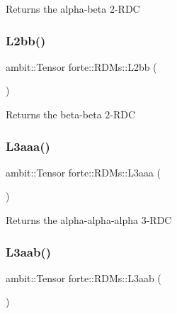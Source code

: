 \begin{DoxyReturn}{Returns}
the alpha-\/beta 2-\/\+R\+DC 
\end{DoxyReturn}
\mbox{\label{classforte_1_1_r_d_ms_ab17613d72744866495c70c87df7fc8fd}} 
\subsubsection{\texorpdfstring{L2bb()}{L2bb()}}
{\footnotesize\ttfamily ambit\+::\+Tensor forte\+::\+R\+D\+Ms\+::\+L2bb (\begin{DoxyParamCaption}{ }\end{DoxyParamCaption})}

\begin{DoxyReturn}{Returns}
the beta-\/beta 2-\/\+R\+DC 
\end{DoxyReturn}
\mbox{\label{classforte_1_1_r_d_ms_acdea5a25d0dfd063e38694b80688e8c4}} 
\subsubsection{\texorpdfstring{L3aaa()}{L3aaa()}}
{\footnotesize\ttfamily ambit\+::\+Tensor forte\+::\+R\+D\+Ms\+::\+L3aaa (\begin{DoxyParamCaption}{ }\end{DoxyParamCaption})}

\begin{DoxyReturn}{Returns}
the alpha-\/alpha-\/alpha 3-\/\+R\+DC 
\end{DoxyReturn}
\mbox{\label{classforte_1_1_r_d_ms_af463c018e20d7e16a72540b0eaa25cff}} 
\subsubsection{\texorpdfstring{L3aab()}{L3aab()}}
{\footnotesize\ttfamily ambit\+::\+Tensor forte\+::\+R\+D\+Ms\+::\+L3aab (\begin{DoxyParamCaption}{ }\end{DoxyParamCaption})}

